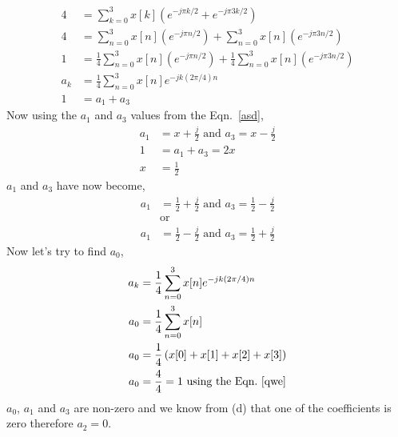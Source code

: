 \documentclass[10pt,a4paper, margin=1in]{article}
\begin{document}
\begin{enumerate}
\begin{enumerate}
     \begin{equation}
    \begin{split}
    	4 & =\sum_{k = 0}^{3} x[k] \left( e^{-j\pi k/2} + e^{-j\pi 3k/2} \right) \\
	4 & =\sum_{n = 0}^{3} x[n] \left( e^{-j\pi n/2} \right) + \sum_{n = 0}^{3} x[n] \left(e^{-j\pi 3n/2} \right) \\ 
	1 & =\frac{1}{4} \sum_{n = 0}^{3} x[n] \left( e^{-j\pi n/2} \right) + \frac{1}{4} \sum_{n = 0}^{3} x[n] \left(e^{-j\pi 3n/2} \right) \\ 
    	a_k & = \frac{1}{4} \sum_{n=0}^{3}x[n]e^{-jk(2\pi/4)n}  \\
	1 & = a_1 + a_3
    \end{split}
    \end{equation}
    Now using the $a_1$ and $a_3$ values from the Eqn.~\ref{asd},
    \begin{equation}
    \begin{split}
    	a_1 & = x + \frac{j}{2} \text{ and } a_3 = x - \frac{j}{2} \\
	1 & = a_1 + a_3 = 2x \\
	x & = \frac{1}{2}
    \end{split}
    \end{equation}
    $a_1$ and $a_3$ have now become,
    \begin{equation}
    \begin{split}
    	a_1 & = \frac{1}{2} + \frac{j}{2} \text{ and } a_3 = \frac{1}{2} - \frac{j}{2} \\
	& \text{or} \\
	a_1 & = \frac{1}{2} - \frac{j}{2} \text{ and } a_3 = \frac{1}{2} + \frac{j}{2} 
    \end{split}
    \end{equation}
    Now let's try to find $a_0$,
    \begin{equation}
    \begin{split}
    	a_k & = \frac{1}{4} \sum_{n=0}^{3}x[n]e^{-jk(2\pi/4)n}  \\
	a_0 & = \frac{1}{4} \sum_{n=0}^{3}x[n] \\
	a_0 & = \frac{1}{4} \left(x[0]+x[1]+x[2]+x[3] \right) \\
	a_0 & = \frac{4}{4} = 1 \text{ using the Eqn.} ~\ref{qwe}
    \end{split}
    \end{equation}
    $a_0$, $a_1$ and $a_3$ are non-zero and we know from (d) that one of the coefficients is zero therefore $a_2=0$.\\

\end{enumerate}
\end{enumerate}
\end{document}
